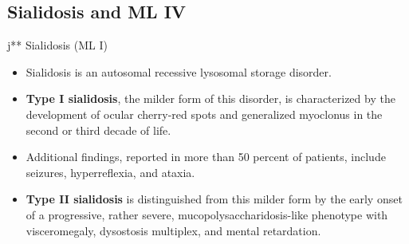 \documentclass{scrartcl}
\begin{document}
\subsection{Sialidosis and ML IV}
\label{sec:org4fdfa59}

j** Sialidosis (ML I)
\begin{itemize}
\item Sialidosis is an autosomal recessive lysosomal storage disorder.

\item \textbf{Type I sialidosis}, the milder form of this disorder, is
characterized by the development of ocular cherry-red spots and
generalized myoclonus in the second or third decade of life.
\item Additional findings, reported in more than 50 percent of patients,
include seizures, hyperreflexia, and ataxia.

\item \textbf{Type II sialidosis} is distinguished from this milder form by the
early onset of a progressive, rather severe,
mucopolysaccharidosis-like phenotype with visceromegaly, dysostosis
multiplex, and mental retardation.
\end{itemize}
\end{document}

